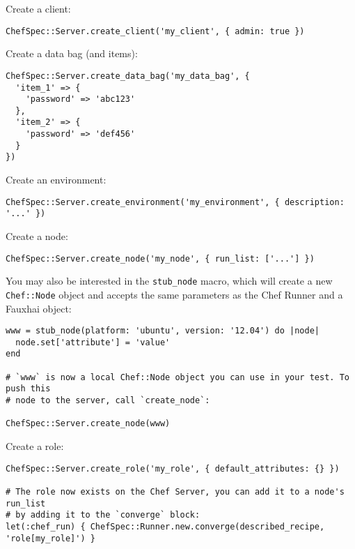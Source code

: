 Create a client:

\begin{lstlisting}[label=lst:testing-chef-zero6]
ChefSpec::Server.create_client('my_client', { admin: true })
\end{lstlisting}

Create a data bag (and items):

\begin{lstlisting}[label=lst:testing-chef-zero7]
ChefSpec::Server.create_data_bag('my_data_bag', {
  'item_1' => {
    'password' => 'abc123'
  },
  'item_2' => {
    'password' => 'def456'
  }
})
\end{lstlisting}

Create an environment:

\begin{lstlisting}[label=lst:testing-chef-zero8]
ChefSpec::Server.create_environment('my_environment', { description: '...' })
\end{lstlisting}

Create a node:

\begin{lstlisting}[label=lst:testing-chef-zero9]
ChefSpec::Server.create_node('my_node', { run_list: ['...'] })
\end{lstlisting}

You may also be interested in the \lstinline!stub_node! macro, which will create a new \lstinline!Chef::Node! object and accepts the same parameters as the Chef Runner and a Fauxhai object:

\begin{lstlisting}[label=lst:testing-chef-zero10]
www = stub_node(platform: 'ubuntu', version: '12.04') do |node|
  node.set['attribute'] = 'value'
end

# `www` is now a local Chef::Node object you can use in your test. To push this
# node to the server, call `create_node`:

ChefSpec::Server.create_node(www)
\end{lstlisting}

Create a role:

\begin{lstlisting}[label=lst:testing-chef-zero11]
ChefSpec::Server.create_role('my_role', { default_attributes: {} })

# The role now exists on the Chef Server, you can add it to a node's run_list
# by adding it to the `converge` block:
let(:chef_run) { ChefSpec::Runner.new.converge(described_recipe, 'role[my_role]') }
\end{lstlisting}

